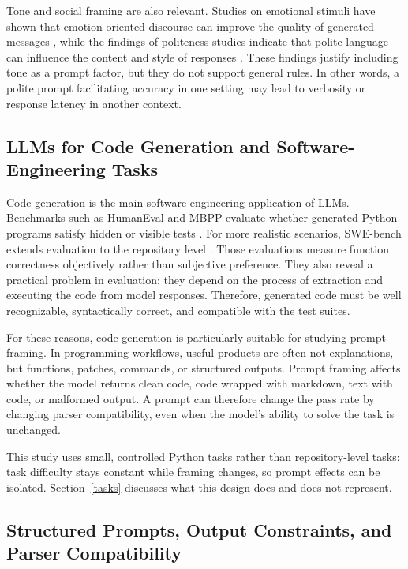 \documentclass{llncs}
\begin{document}
Tone and social framing are also relevant. Studies on emotional stimuli have shown that emotion-oriented discourse can improve the quality of generated messages \citep{li2023emotionprompt}, while the findings of politeness studies indicate that polite language can influence the content and style of responses \citep{yin2024politeness}. These findings justify including tone as a prompt factor, but they do not support general rules. In other words, a polite prompt facilitating accuracy in one setting may lead to verbosity or response latency in another context.

\subsection{LLMs for Code Generation and Software-Engineering
Tasks}\label{llms-for-code-generation-and-software-engineering-tasks}

Code generation is the main software engineering application of LLMs. Benchmarks such as HumanEval and MBPP evaluate whether generated Python programs satisfy hidden or visible tests \citep{chen2021codex, austin2021mbpp}. For  more realistic scenarios, SWE-bench extends evaluation to the repository level \citep{jimenez2023swebench}. Those evaluations measure function correctness objectively rather than subjective preference. They also reveal a practical problem in evaluation: they depend on the process of extraction and executing the code from model responses. Therefore, generated code must be well recognizable, syntactically correct, and compatible with the test suites.

For these reasons, code generation is particularly suitable for studying prompt framing. In programming workflows, useful products are often not explanations, but functions, patches, commands, or structured outputs. Prompt framing affects whether the model returns clean code, code wrapped with markdown, text with code, or malformed output. A prompt can therefore change the pass rate by changing parser compatibility, even when the model's ability to solve the task is unchanged.

This study uses small, controlled Python tasks rather than repository-level tasks: task difficulty stays constant while framing changes, so prompt effects can be isolated. Section~\ref{tasks} discusses what this design does and does not represent.

\subsection{Structured Prompts, Output Constraints, and Parser
Compatibility}\label{structured-prompts-output-constraints-and-parser-compatibility}
\end{document}

